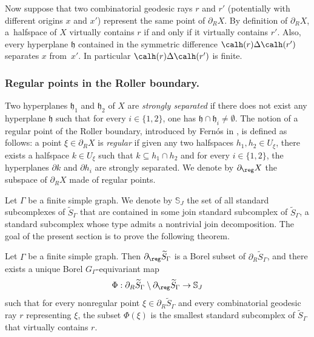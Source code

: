 Now suppose that two combinatorial geodesic rays $r$ and $r'$ (potentially with different origins $x$ and $x'$) represent the same point of $\partial_R X$. By definition of $\partial_R X$, a~halfspace of $X$ virtually contains $r$ if and only if it virtually contains $r'$. Also, \hbox{every} hyperplane $\mathfrak{h}$ contained in the symmetric difference $\calh(r)\Delta\calh(r')$ separates $x$ from~$x'$. In particular $\calh(r)\Delta\calh(r')$ is finite.

\subsubsection*{Regular points in the Roller boundary.} Two hyperplanes $\mathfrak{h}_1$ and $\mathfrak{h}_2$ of $X$ are \emph{strongly separated} \cite[Def.\,2.1]{behrstock2012divergence} if there does not exist any hyperplane $\mathfrak{h}$ such that for every $i\in\{1,2\}$, one has $\mathfrak{h}\cap\mathfrak{h}_i\neq\emptyset$. The notion of a regular point of the Roller boundary, introduced by Fernós in \cite[Def.\,7.3]{Fer}, is defined as follows: a point $\xi\in\partial_R X$ is \emph{regular} if given any two halfspaces $h_1,h_2\in U_\xi$, there exists a halfspace $k\in U_\xi$ such that $k\subseteq h_1\cap h_2$ and for every $i\in\{1,2\}$, the hyperplanes $\partial k$ and $\partial h_i$ are strongly separated. We denote by $\partial_{\reg}X$ the subspace of $\partial_R X$ made of regular points.


Let $\Gamma$ be a finite simple graph. We denote by $\mathbb{S}_J$ the set of all standard subcomplexes of $\widetilde{S}_\Gamma$ that are contained in some join standard subcomplex of $\widetilde{S}_\Gamma$, \ie a standard subcomplex whose type admits a nontrivial join decomposition. The goal of the present section is to prove the following theorem.

\begin{theo}\label{theo:roller}
Let $\Gamma$ be a finite simple graph. Then $\partial_\reg\widetilde{S}_\Gamma$ is a Borel subset of $\partial_R\widetilde{S}_\Gamma$, and there exists a unique Borel $G_\Gamma$-equivariant map
\[
\Phi:\partial_R\widetilde{S}_\Gamma\setminus\partial_\reg\widetilde{S}_\Gamma\to\mathbb{S}_J
\]
such that for every nonregular point $\xi\in\partial_R\widetilde{S}_\Gamma$ and every combinatorial geodesic ray $r$ representing $\xi$, the subset $\Phi(\xi)$ is the smallest standard subcomplex of $\widetilde{S}_\Gamma$ that virtually contains $r$.
\end{theo}

